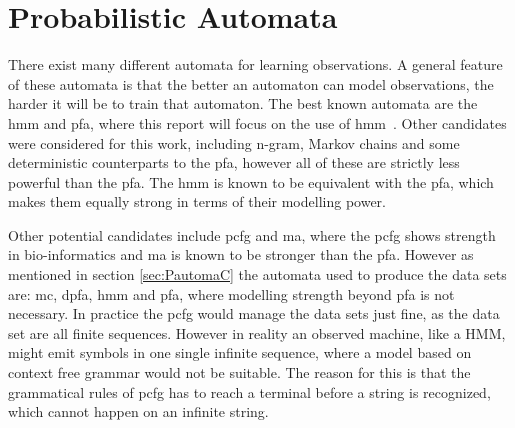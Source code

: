 \section{Probabilistic Automata}
There exist many different automata for learning observations. A general feature of these automata is that the better an automaton can model observations, the harder it will be to train that automaton. The best known automata are the \gls{hmm} and \gls{pfa}, where this report will focus on the use of \gls{hmm}~\cite{PautomaCTR}.
Other candidates were considered for this work, including n-gram, Markov chains and some deterministic counterparts to the \gls{pfa}, however all of these are strictly less powerful than the \gls{pfa}. The \gls{hmm} is known to be equivalent with the \gls{pfa}, which makes them equally strong in terms of their modelling power.

Other potential candidates include \gls{pcfg} and \gls{ma}, where the \gls{pcfg} shows strength in bio-informatics and \gls{ma} is known to be stronger than the \gls{pfa}. However as mentioned in section \ref{sec:PautomaC} the automata used to produce the data sets are: \gls{mc}, \gls{dpfa}, \gls{hmm} and \gls{pfa}, where modelling strength beyond \gls{pfa} is not necessary. In practice the \gls{pcfg} would manage the data sets just fine, as the data set are all finite sequences. However in reality an observed machine, like a HMM, might emit symbols in one single infinite sequence, where a model based on context free grammar would not be suitable. The reason for this is that the grammatical rules of \gls{pcfg} has to reach a terminal before a string is recognized, which cannot happen on an infinite string.